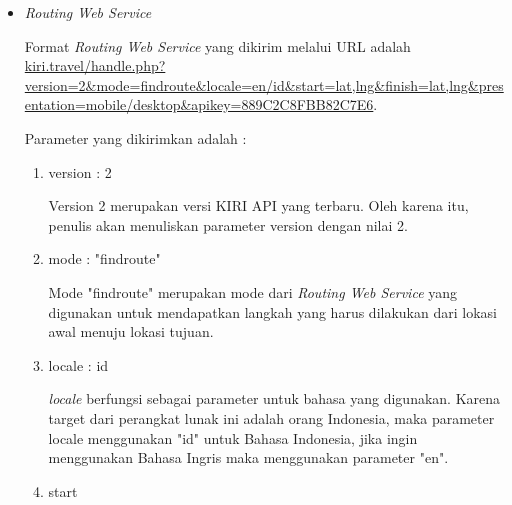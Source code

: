\begin{itemize}
	\begin{lstlisting} [caption= hasil kembalian dari \textit{Search Place Web Service}]
	{
			"status":"ok",
			"searchresult":[
					{
						"placename":"J.Co Donuts & Coffee",
						"location":"-6.88929,107.59574"
					},
					{
						"placename":"Pepper Lunch Bandung (PVJ)",
						"location":"-6.88923,107.59615"
					},
					{
						"placename":"Domino's Pizza Pvj",
						"location":"-6.90348,107.61709"
					},
					{
						"placename":"Outlet Alleira Batik PVJ Bandung",
						"location":"-6.88875,107.59634"
					},
					{
						"placename":"Burger King Bandung PVJ Mall",
						"location":"-6.88894,107.59342"
					},
					{
						"placename":"Killiney Kopitiam PVJ",
						"location":"-6.88947,107.59654"
					},
					{
						"placename":"Adidas Pvj",
						"location":"-6.88909,107.59614"
					},
					{
						"placename":"Crocs - PVJ",
						"location":"-6.88894,107.59342"
					},
					{
						"placename":"Cross Pvj",
						"location":"-6.88906,107.59619"
					},
					{
						"placename":"Jonas Photo - PVJ",
						"location":"-6.88913,107.59643"
					}
				],
				"attributions":null
	}\end{lstlisting}
	
	\item \textit{Routing Web Service}
	
	Format \textit{Routing Web Service} yang dikirim melalui URL adalah \url{kiri.travel/handle.php?version=2&mode=findroute&locale=en/id&start=lat,lng&finish=lat,lng&presentation=mobile/desktop&apikey=889C2C8FBB82C7E6}.
	
	Parameter yang dikirimkan adalah :
	
	\begin{enumerate}
		\item version : 2
		
		Version 2 merupakan versi KIRI API yang terbaru. Oleh karena itu, penulis akan menuliskan parameter version dengan nilai 2.
		\item mode : "findroute"
		
		Mode "findroute" merupakan mode dari \textit{Routing Web Service} yang digunakan untuk mendapatkan langkah yang harus dilakukan dari lokasi awal menuju lokasi tujuan.
		\item locale : id
		
		\textit{locale} berfungsi sebagai parameter untuk bahasa yang digunakan. Karena target dari perangkat lunak ini adalah orang Indonesia, maka parameter locale menggunakan "id" untuk Bahasa Indonesia, jika ingin menggunakan Bahasa Ingris maka menggunakan parameter "en".
		\item start
		

\end{enumerate}
\end{itemize}
